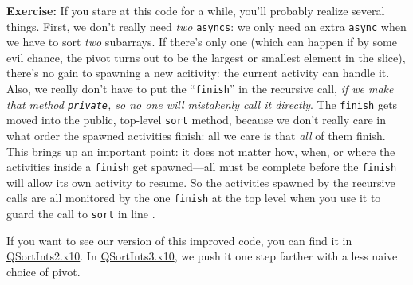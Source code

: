 {\bf Exercise:} If you stare at this code for a while, you'll probably realize several things.
First, we don't really need {\em two} {\tt asyncs}: we only need an extra {\tt async}
when we have
to sort {\em two} subarrays.  If there's only one (which can happen if by some evil
chance, the pivot turns out to be the largest or smallest element in the slice),
there's no gain to spawning a new acitivity: the current activity can handle it.
Also, we really don't have to put the ``{\tt finish}'' in the
recursive call, {\em if we make that method {\tt private}, so no one will mistakenly call it
directly}.  The {\tt finish} gets moved into the public, top-level {\tt sort} method, because
we don't really care in what order the spawned activities finish: all we care is that {\em all}
of them finish.  This brings up an important point: it does not matter how, when, or where the
activities inside a {\tt finish} get spawned---all must be complete
before the {\tt finish} will allow its own activity to resume.  So the activities spawned by the
recursive calls are all monitored by the one {\tt finish} at the top level when
you use it to guard the call to {\tt sort} in line .

If you want to see our version of this improved code, you can find it in
\href{chapter-concurrency/QSortInts2.x10}{QSortInts2.x10}.  In
\href{chapter-concurrency/QSortInts3.x10}{QSortInts3.x10}, we push it one step
farther with a less naive choice of pivot.

